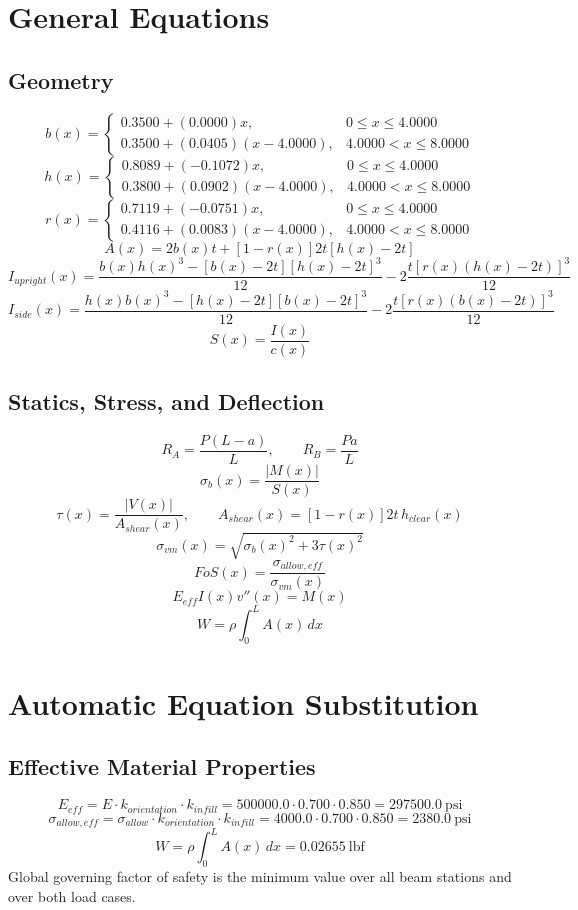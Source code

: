 \documentclass[11pt]{article}
\begin{document}
\section*{General Equations}
\subsection*{Geometry}
\[
b(x)=\begin{cases}0.3500 + (0.0000)x, & 0 \le x \le 4.0000\\0.3500 + (0.0405)(x-4.0000), & 4.0000 < x \le 8.0000\end{cases}
\]
\[
h(x)=\begin{cases}0.8089 + (-0.1072)x, & 0 \le x \le 4.0000\\0.3800 + (0.0902)(x-4.0000), & 4.0000 < x \le 8.0000\end{cases}
\]
\[
r(x)=\begin{cases}0.7119 + (-0.0751)x, & 0 \le x \le 4.0000\\0.4116 + (0.0083)(x-4.0000), & 4.0000 < x \le 8.0000\end{cases}
\]
\[
A(x)=2b(x)t+[1-r(x)]2t[h(x)-2t]
\]
\[
I_{upright}(x)=\frac{b(x)h(x)^3-[b(x)-2t][h(x)-2t]^3}{12}-2\frac{t[r(x)(h(x)-2t)]^3}{12}
\]
\[
I_{side}(x)=\frac{h(x)b(x)^3-[h(x)-2t][b(x)-2t]^3}{12}-2\frac{t[r(x)(b(x)-2t)]^3}{12}
\]
\[
S(x)=\frac{I(x)}{c(x)}
\]

\subsection*{Statics, Stress, and Deflection}
\[
R_A=\frac{P(L-a)}{L}, \qquad R_B=\frac{Pa}{L}
\]
\[
\sigma_b(x)=\frac{|M(x)|}{S(x)}
\]
\[
\tau(x)=\frac{|V(x)|}{A_{shear}(x)}, \qquad A_{shear}(x)=[1-r(x)]2t\,h_{clear}(x)
\]
\[
\sigma_{vm}(x)=\sqrt{\sigma_b(x)^2+3\tau(x)^2}
\]
\[
FoS(x)=\frac{\sigma_{allow,eff}}{\sigma_{vm}(x)}
\]
\[
E_{eff}I(x)v''(x)=M(x)
\]
\[
W=\rho\int_0^L A(x)\,dx
\]

\section*{Automatic Equation Substitution}
\subsection*{Effective Material Properties}
\[E_{eff} = E \cdot k_{orientation} \cdot k_{infill} = 500000.0 \cdot 0.700 \cdot 0.850 = 297500.0\ \mathrm{psi}\]
\[\sigma_{allow,eff} = \sigma_{allow} \cdot k_{orientation} \cdot k_{infill} = 4000.0 \cdot 0.700 \cdot 0.850 = 2380.0\ \mathrm{psi}\]
\[W = \rho \int_0^L A(x)\,dx = 0.02655\ \mathrm{lbf}\]
Global governing factor of safety is the minimum value over all beam stations and over both load cases.
\end{document}
